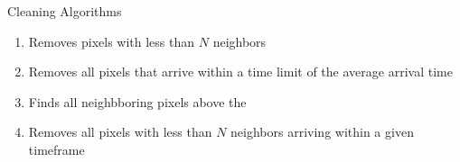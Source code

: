 \begin{frame}[t]{Cleaning Algorithms}
{\begin{overlayarea}{0.58\textwidth}{3.5cm}
{\begin{enumerate}
        \item Removes pixels with less than \(N\) neighbors
        \item Removes all pixels that arrive within a time limit of the average arrival time
        \item Finds all neighbboring pixels above the 
        \item Removes all pixels with less than \(N\) neighbors arriving within a given timeframe
      \end{enumerate}
      }
    \end{overlayarea}
    }
  \end{frame}